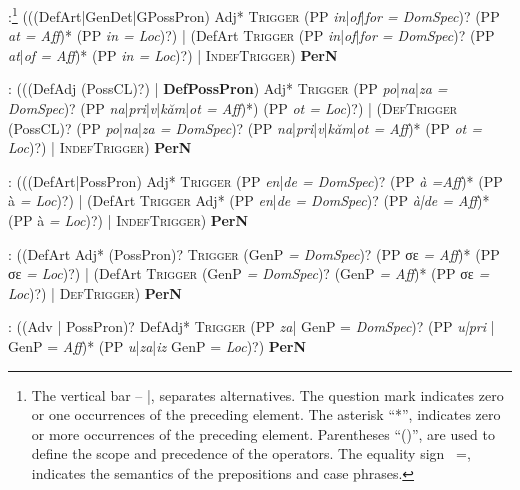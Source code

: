 \documentclass[output=paper]{langsci/langscibook}
\newcommand{\trigger}[1]{\textsc{#1}}
\begin{document}
:\footnote{The vertical
bar – |, separates alternatives. The question mark indicates zero or
one occurrences of the preceding element. The asterisk  ``*'', indicates
zero or more occurrences of the preceding element. Parentheses ``()'',
are used to define the scope and precedence of the operators. The
equality sign \ =, indicates the semantics of the prepositions and case
phrases.}
(((DefArt|GenDet|GPossPron) Adj*
\trigger{Trigger} (PP \textit{in}|\textit{of}|\textit{for = DomSpec})? (PP
\textit{at = Aff})* (PP \textit{in = Loc})?) | (DefArt \trigger{Trigger} (PP \textit{in}|\textit{of}|\textit{for = DomSpec})?
(PP \textit{at}|\textit{of = Aff})* (PP \textit{in = Loc})?) | \trigger{IndefTrigger)}  \textbf{PerN}



: (((DefAdj (PossCL)?) | \textbf{DefPossPron}) Adj* \trigger{Trigger}
(PP \textit{po}|\textit{na}|\textit{za = DomSpec})? (PP \textit{na}|\textit{pri}|\textit{v}|\textit{kăm}|\textit{ot = Aff})*)
(PP \textit{ot = Loc})?) | (\trigger{DefTrigger} (PossCL)? (PP
\textit{po}|\textit{na}|\textit{za = DomSpec})? (PP \textit{na}|\textit{pri}|\textit{v}|\textit{kăm}|\textit{ot = Aff})* (PP
\textit{ot = Loc})?) | \trigger{IndefTrigger}) \textbf{PerN}




: (((DefArt|PossPron) Adj* \trigger{Trigger} (PP
\textit{en}|\textit{de = DomSpec})? (PP
\textit{à =Aff})* (PP à
\textit{= Loc})?) | (DefArt
\trigger{Trigger} Adj* (PP \textit{en}|\textit{de = DomSpec})? (PP
\textit{à|de = Aff})* (PP à \textit{= Loc})?)   |
\trigger{IndefTrigger})  \textbf{PerN}



: ((DefArt Adj* (PossPron)? \trigger{Trigger} (GenP \textit{= DomSpec})?
(PP σε \textit{= Aff})* (PP σε \textit{= Loc})?) | (DefArt
\trigger{Trigger} (GenP \textit{= DomSpec})? (GenP \textit{= Aff})* (PP
σε \textit{= Loc})?) | \trigger{DefTrigger)}  \textbf{PerN}



: ((Adv | PossPron)? DefAdj* \trigger{Trigger} (PP \textit{za}| GenP =
\textit{DomSpec})? (PP \textit{u|pri} | GenP = \textit{Aff})* (PP
\textit{u}|\textit{za}|\textit{iz} GenP = \textit{Loc})?)  \textbf{PerN}
\end{document}
